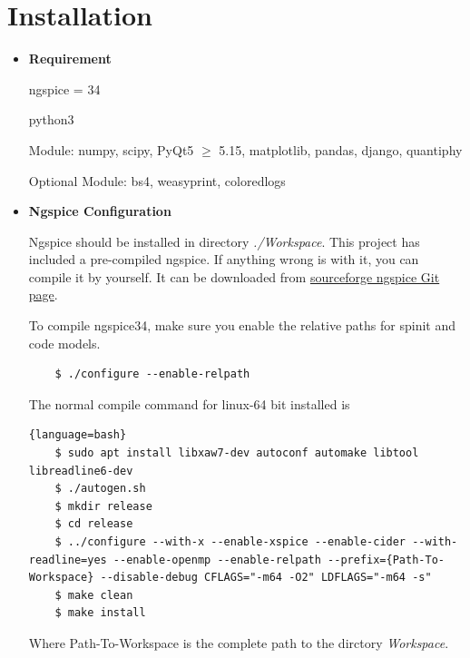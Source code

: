 \documentclass[12pt,a4paper]{article}
\begin{document}
\section{Installation}
\begin{itemize}
    \item \textbf{Requirement}\par
    ngspice = 34\par
    python3\par
    Module: numpy, scipy, PyQt5 $\geqslant$ 5.15, matplotlib, pandas, django, quantiphy\par
    Optional Module: bs4, weasyprint, coloredlogs\par

    \item  \textbf{Ngspice Configuration}\par
    Ngspice should be installed in directory \textit{./Workspace}. This project has included a pre-compiled ngspice. If anything wrong is with it, you can compile it by yourself. It can be downloaded from \href{https://sourceforge.net/projects/ngspice/}{sourceforge ngspice Git page}.

    To compile ngspice34, make sure you enable the relative paths for spinit and code models.
    \begin{lstlisting}
    $ ./configure --enable-relpath
    \end{lstlisting}

    The normal compile command for linux-64 bit installed is
    \begin{lstlisting}{language=bash}
    $ sudo apt install libxaw7-dev autoconf automake libtool libreadline6-dev
    $ ./autogen.sh
    $ mkdir release
    $ cd release
    $ ../configure --with-x --enable-xspice --enable-cider --with-readline=yes --enable-openmp --enable-relpath --prefix={Path-To-Workspace} --disable-debug CFLAGS="-m64 -O2" LDFLAGS="-m64 -s"
    $ make clean
    $ make install
    \end{lstlisting}
    Where Path-To-Workspace is the complete path to the dirctory \textit{Workspace}.
\end{itemize}
\end{document}
